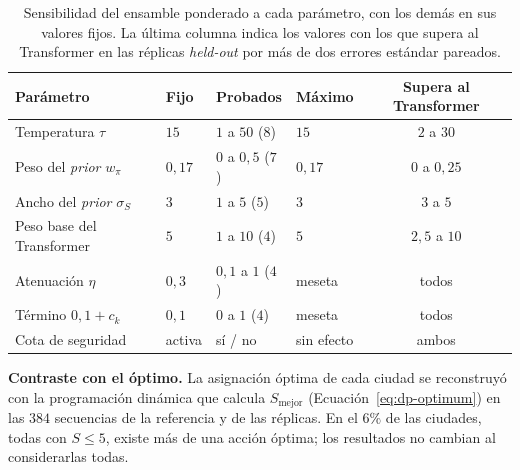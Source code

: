 \documentclass[../00_Main/Main.tex]{subfiles}
\begin{document}
\begin{table}[H]
\centering
\caption[Sensibilidad del ensamble ponderado]{Sensibilidad del ensamble
ponderado a cada par\'ametro, con los dem\'as en sus valores fijos. La
\'ultima columna indica los valores con los que supera al Transformer en
las r\'eplicas \emph{held-out} por m\'as de dos errores est\'andar
pareados.}
\label{tab:sensitivity}
\small
\begin{tabular}{@{}llllc@{}}
\toprule
\textbf{Par\'ametro} & \textbf{Fijo} & \textbf{Probados} & \textbf{M\'aximo} & \textbf{Supera al Transformer} \\
\midrule
Temperatura $\tau$            & $15$      & $1$ a $50$ ($8$)  & $15$         & $2$ a $30$ \\
Peso del \emph{prior} $w_\pi$ & $0{,}17$  & $0$ a $0{,}5$ ($7$) & $0{,}17$   & $0$ a $0{,}25$ \\
Ancho del \emph{prior} $\sigma_S$ & $3$   & $1$ a $5$ ($5$)   & $3$          & $3$ a $5$ \\
Peso base del Transformer     & $5$       & $1$ a $10$ ($4$)  & $5$          & $2{,}5$ a $10$ \\
Atenuaci\'on $\eta$           & $0{,}3$   & $0{,}1$ a $1$ ($4$) & meseta     & todos \\
T\'ermino $0{,}1 + c_k$       & $0{,}1$   & $0$ a $1$ ($4$)   & meseta       & todos \\
Cota de seguridad             & activa    & s\'i / no          & sin efecto  & ambos \\
\bottomrule
\end{tabular}
\end{table}

\textbf{Contraste con el \'optimo.} La asignaci\'on \'optima de cada ciudad
se reconstruy\'o con la programaci\'on din\'amica que calcula
$S_{\mathrm{mejor}}$ (Ecuaci\'on~\eqref{eq:dp-optimum}) en las $384$ secuencias de
la referencia y de las r\'eplicas. En el $6\%$ de las ciudades, todas con
$S \le 5$, existe m\'as de una acci\'on \'optima; los resultados no cambian
al considerarlas todas.
\end{document}
